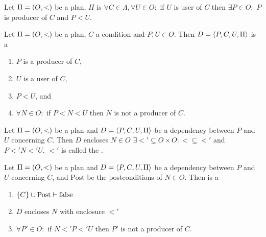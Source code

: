 \begin{defi}
Let $\Pi=\left( O,<\right)$ be a plan, $\Pi$ is  \iffTx{} $\forall C\in\Lambda,\forall U\in O:$ if $U$ is user of $C$ then $\exists P\in O:$ $P$ is producer of $C$ and $P<U$.
\cite{conf/ijcai/HertzbergH89}
\end{defi}

\begin{defi}
Let $\Pi=\left( O,<\right)$ be a plan, $C$ a condition and $P,U\in O$. Then $D=\left\langle P,C,U,\Pi\right\rangle$ is a  \iffTx{}
\begin{enumerate}
 \item $P$ is a producer of $C$,
 \item $U$ is a user of $C$,
 \item $P<U$, and
 \item $\forall N\in O:$ if $P<N<U$ then $N$ is not a producer of $C$.
\end{enumerate}
\cite{conf/ijcai/HertzbergH89}
\end{defi}

\begin{defi}
Let $\Pi=\left( O,<\right)$ be a plan and $D=\left\langle P,C,U,\Pi\right\rangle$ be a dependency between $P$ and $U$ concerning $C$. Then $D$ encloses $N\in O$ \iffTx{} $\exists<'\subseteq O\times O:<\subseteq<'$ and $P<'N<'U$. $<'$ is called the .
\cite{conf/ijcai/HertzbergH89}
\end{defi}

\begin{defi}
Let $\Pi=\left( O,<\right)$ be a plan and $D=\left\langle P,C,U,\Pi\right\rangle$ be a dependency between $P$ and $U$ concerning $C$, and $\mbox{Post}$ be the postconditions of $N\in O$. Then  is a  \iffTx{}
\begin{enumerate}
 \item $\left\{ C\right\}\cup\mbox{Post}\vdash\mbox{false}$
 \item $D$ encloses $N$ with enclosure $<'$
 \item $\forall P'\in O:$ if $N<'P<'U$ then $P'$ is not a producer of $C$.
\end{enumerate}
\cite{conf/ijcai/HertzbergH89}
\end{defi}

